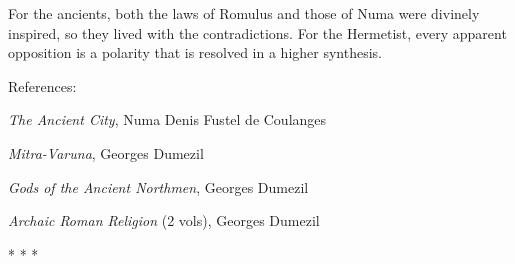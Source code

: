 For the ancients, both the laws of Romulus and those of Numa were divinely inspired, so they lived with the contradictions. For the Hermetist, every apparent opposition is a polarity that is resolved in a higher synthesis.

References:

\emph{The Ancient City}, Numa Denis Fustel de Coulanges

\emph{Mitra-Varuna}, Georges Dumezil

\emph{Gods of the Ancient Northmen}, Georges Dumezil

\emph{Archaic Roman Religion} (2 vols), Georges Dumezil




\begin{center}* * *\end{center}

